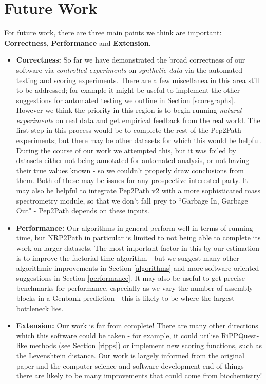 \documentclass{l4proj}
\begin{document}
\section{Future Work}

For future work, there are three main points we think are important: \textbf{Correctness}, \textbf{Performance} and \textbf{Extension}.

\begin{itemize}
\item \textbf{Correctness:} So far we have demonstrated the broad correctness of our software via \textit{controlled experiments} on \textit{synthetic data} via the automated testing and scoring experiments. There are a few miscellanea in this area still to be addressed; for example it might be useful to implement the other suggestions for automated testing we outline in Section \ref{scoregraphs}. However we think the priority in this region is to begin running \textit{natural experiments} on real data and get empirical feedback from the real world. The first step in this process would be to complete the rest of the Pep2Path experiments; but there may be other datasets for which this would be helpful. During the course of our work we attempted this, but it was foiled by datasets either not being annotated for automated analysis, or not having their true values known - so we couldn't properly draw conclusions from them. Both of these may be issues for any prospective interested party. It may also be helpful to integrate Pep2Path v2 with a more sophisticated mass spectrometry module, so that we don't fall prey to ``Garbage In, Garbage Out" - Pep2Path depends on these inputs.
\item \textbf{Performance:} Our algorithms in general perform well in terms of running time, but NRP2Path in particular is limited to not being able to complete its work on larger datasets. The most important factor in this by our estimation is to improve the factorial-time algorithm - but we suggest many other algorithmic improvements in Section \ref{algorithms} and more software-oriented suggestions in Section \ref{performance}. It may also be useful to get precise benchmarks for performance, especially as we vary the number of assembly-blocks in a Genbank prediction - this is likely to be where the largest bottleneck lies.
\item \textbf{Extension:} Our work is far from complete! There are many other directions which this software could be taken - for example, it could utilise RiPPQuest-like methods (see Section \ref{ripps}) or implement new scoring functions, such as the Levenshtein distance. Our work is largely informed from the original paper and the computer science and software development end of things - there are likely to be many improvements that could come from biochemistry!
\end{itemize}
\end{document}
